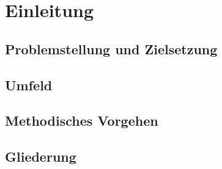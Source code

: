 
\chapter{Einleitung}
\label{ch:Introduction}

\section{Problemstellung und Zielsetzung}

\section{Umfeld}

\section{Methodisches Vorgehen}

\section{Gliederung}